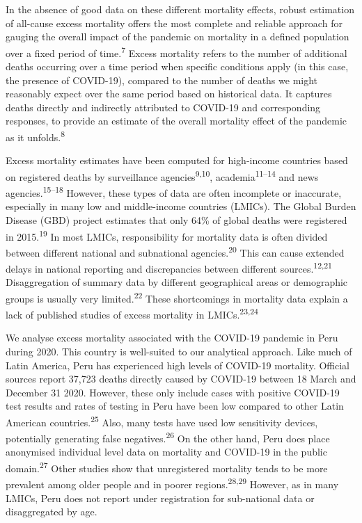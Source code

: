 \documentclass[
]{article}
\begin{document}
In the absence of good data on these different mortality effects, robust estimation of all-cause excess mortality offers the most complete and reliable approach for gauging the overall impact of the pandemic on mortality in a defined population over a fixed period of time.\textsuperscript{7} Excess mortality refers to the number of additional deaths occurring over a time period when specific conditions apply (in this case, the presence of COVID-19), compared to the number of deaths we might reasonably expect over the same period based on historical data. It captures deaths directly and indirectly attributed to COVID-19 and corresponding responses, to provide an estimate of the overall mortality effect of the pandemic as it unfolds.\textsuperscript{8}

Excess mortality estimates have been computed for high-income countries based on registered deaths by surveillance agencies\textsuperscript{9,10}, academia\textsuperscript{11--14} and news agencies.\textsuperscript{15--18} However, these types of data are often incomplete or inaccurate, especially in many low and middle-income countries (LMICs). The Global Burden Disease (GBD) project estimates that only 64\% of global deaths were registered in 2015.\textsuperscript{19} In most LMICs, responsibility for mortality data is often divided between different national and subnational agencies.\textsuperscript{20} This can cause extended delays in national reporting and discrepancies between different sources.\textsuperscript{12,21} Disaggregation of summary data by different geographical areas or demographic groups is usually very limited.\textsuperscript{22} These shortcomings in mortality data explain a lack of published studies of excess mortality in LMICs.\textsuperscript{23,24}

We analyse excess mortality associated with the COVID-19 pandemic in Peru during 2020. This country is well-suited to our analytical approach. Like much of Latin America, Peru has experienced high levels of COVID-19 mortality. Official sources report 37,723 deaths directly caused by COVID-19 between 18 March and December 31 2020. However, these only include cases with positive COVID-19 test results and rates of testing in Peru have been low compared to other Latin American countries.\textsuperscript{25} Also, many tests have used low sensitivity devices, potentially generating false negatives.\textsuperscript{26} On the other hand, Peru does place anonymised individual level data on mortality and COVID-19 in the public domain.\textsuperscript{27} Other studies show that unregistered mortality tends to be more prevalent among older people and in poorer regions.\textsuperscript{28,29} However, as in many LMICs, Peru does not report under registration for sub-national data or disaggregated by age.
\end{document}
